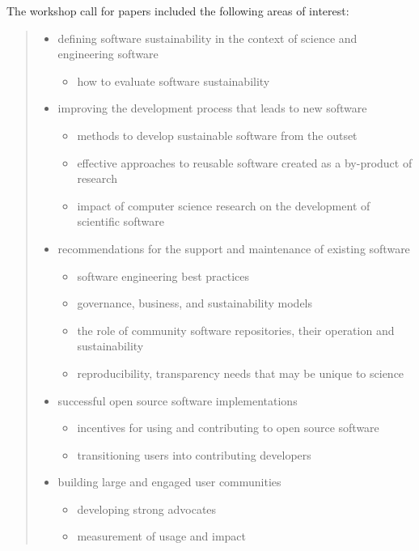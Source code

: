 \documentclass[11pt, oneside]{amsart}
\begin{document}
The workshop call for papers included the following areas of interest:
\begin{quote}
\begin{itemize}

\item defining software sustainability in the context of science and engineering software
\begin{itemize}
\item how to evaluate software sustainability
\end{itemize}

\item improving the development process that leads to new software
\begin{itemize}
\item methods to develop sustainable software from the outset
\item effective approaches to reusable software created as a by-product of research
\item impact of computer science research on the development of scientific software
\end{itemize}

\item recommendations for the support and maintenance of existing software
\begin{itemize}
\item software engineering best practices
\item governance, business, and sustainability models
\item the role of community software repositories, their operation and sustainability
\item reproducibility, transparency needs that may be unique to science
\end{itemize}

\item successful open source software implementations
\begin{itemize}
\item incentives for using and contributing to open source software
\item transitioning users into contributing developers
\end{itemize}

\item building large and engaged user communities
\begin{itemize}
\item developing strong advocates
\item measurement of usage and impact
\end{itemize}


\end{itemize}
\end{quote}
\end{document}
